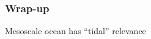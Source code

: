 \begin{frame}
\frametitle{Wrap-up}
Mesoscale ocean has ``tidal'' relevance
\begin{multicols}{2}
\tiny

\end{multicols}
\normalsize
\end{frame}